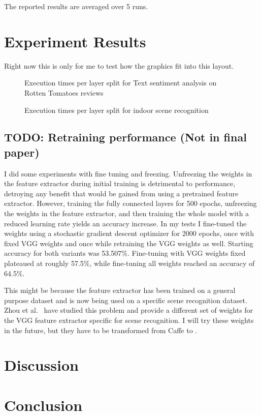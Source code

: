 \documentclass[11pt,twocolumn]{article}
\begin{document}
The reported results are averaged over 5 runs.

\section{Experiment Results}
\label{sec:results}

Right now this is only for me to test how the graphics fit into this layout.


\begin{figure}[h]
    \centering
	
    \caption{Execution times per layer split for Text sentiment analysis on Rotten Tomatoes reviews}
\end{figure}

\begin{figure*}
	\centering
	
    \caption{Execution times per layer split for indoor scene recognition}
\end{figure*}

\subsection{TODO: Retraining performance (Not in final paper)}

I did some experiments with fine tuning and freezing.
Unfreezing the weights in the feature extractor during initial training is detrimental to performance, detroying any benefit that would be gained from using a pretrained feature extractor.
However, training the fully connected layers for 500 epochs, unfreezing the weights in the feature extractor, and then training the whole model with a reduced learning rate yields an accuracy increase.
In my tests I fine-tuned the weights using a stochastic gradient descent optimizer for 2000 epochs, once with fixed VGG weights and once while retraining the VGG weights as well.
Starting accuracy for both variants was 53.507\%.
Fine-tuning with VGG weights fixed plateaued at roughly 57.5\%, while fine-tuning all weights reached an accuracy of 64.5\%.

This might be because the feature extractor has been trained on a general purpose dataset and is now being used on a specific scene recognition dataset.
Zhou et al.~\cite{zhou_learning_2014} have studied this problem and provide a different set of weights for the VGG feature extractor specific for scene recognition.
I will try these weights in the future, but they have to be transformed from Caffe to \tf{}.

\section{Discussion}
\label{sec:discussion}

\section{Conclusion}
\label{sec:conclusion}



\end{document}
